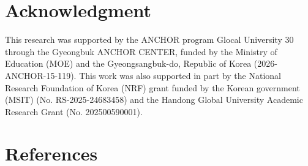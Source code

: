\documentclass[12pt]{iopart}
\begin{document}
\section*{Acknowledgment}
This research was supported by the ANCHOR program Glocal University 30 through the Gyeongbuk ANCHOR CENTER, funded by the Ministry of Education (MOE) and the Gyeongsangbuk-do, Republic of Korea (2026-ANCHOR-15-119). This work was also supported in part by the National Research Foundation of Korea (NRF) grant funded by the Korean government (MSIT) (No. RS-2025-24683458) and the Handong Global University Academic Research Grant (No. 202500590001).

\section*{References}


\end{document}
